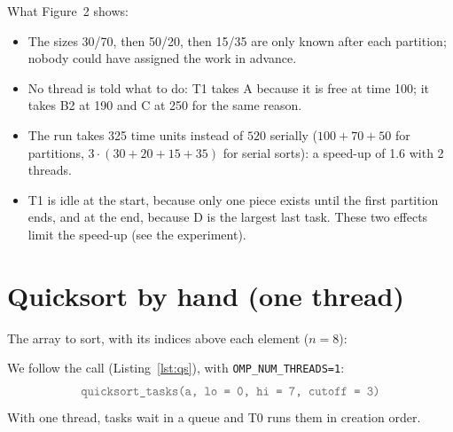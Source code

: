 \documentclass[11pt,a4paper]{article}
\let\origtexttt\texttt
\renewcommand{\texttt}[1]{\textcolor{black!60}{\origtexttt{#1}}}
\newcommand{\arr}[1]{%
  \foreach \v/\c [count=\k from 0] in {#1} {
    \node[\c] at (0.85*\k,0) {\v};
    \node[font=\tiny, text=gray] at (0.85*\k,0.6) {\k};
  }}
\begin{document}
\noindent What Figure~2 shows:
\begin{itemize}
  \item The sizes 30/70, then 50/20, then 15/35 are only known after each partition; nobody
        could have assigned the work in advance.
  \item No thread is told what to do: T1 takes A because it is free at time 100; it takes B2
        at 190 and C at 250 for the same reason.
  \item The run takes 325 time units instead of $520$ serially ($100+70+50$ for partitions,
        $3\cdot(30+20+15+35)$ for serial sorts): a speed-up of 1.6 with 2 threads.
  \item T1 is idle at the start, because only one piece exists until the first partition ends,
        and at the end, because D is the largest last task. These two effects limit the
        speed-up (see the experiment).
\end{itemize}

\section{Quicksort by hand (one thread)}
The array to sort, with its indices above each element ($n = 8$):
\begin{center}
\end{center}
We follow the call (Listing~\ref{lst:qs}), with \texttt{OMP\_NUM\_THREADS=1}:
\[
  \texttt{quicksort\_tasks(a,\ lo = 0,\ hi = 7,\ cutoff = 3)}
\]
With one thread, tasks wait in a queue and T0 runs them in creation order.

\begin{center}
\small
{}
\end{center}

\end{document}
